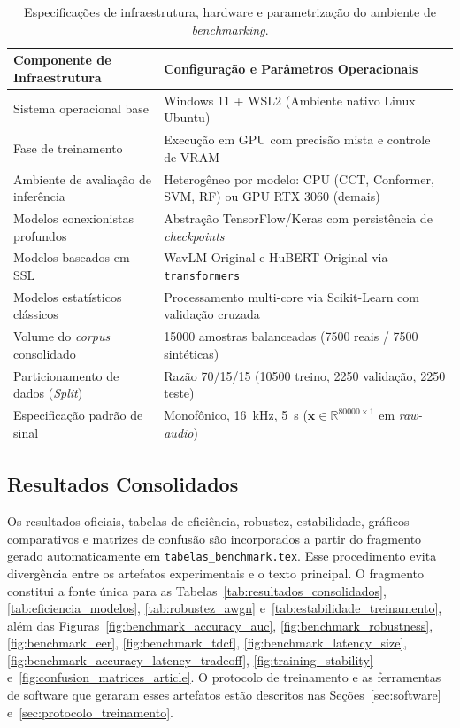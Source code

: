 \documentclass[12pt,a4paper]{article}
\begin{document}
\begin{table}[tbp]
\centering
\caption{Especificações de infraestrutura, hardware e parametrização do ambiente de \textit{benchmarking}.}
\label{tab:hardware_benchmark}
\small\singlespacing
\setlength{\tabcolsep}{4pt}
\begin{tabular}{@{}>{\raggedright\arraybackslash}p{4.2cm}
                >{\raggedright\arraybackslash}p{10.5cm}@{}}
\toprule
\textbf{Componente de Infraestrutura} & \textbf{Configuração e Parâmetros Operacionais} \\
\midrule
Sistema operacional base & Windows 11 + WSL2 (Ambiente nativo Linux Ubuntu) \\
Fase de treinamento & Execução em GPU com precisão mista e controle de VRAM \\
Ambiente de avaliação de inferência & Heterogêneo por modelo: CPU (CCT, Conformer, SVM, RF) ou GPU RTX 3060 (demais) \\
Modelos conexionistas profundos & Abstração TensorFlow/Keras com persistência de \textit{checkpoints} \\
Modelos baseados em SSL & WavLM Original e HuBERT Original via \texttt{transformers} \\
Modelos estatísticos clássicos & Processamento multi-core via Scikit-Learn com validação cruzada \\
Volume do \textit{corpus} consolidado & \num{15000} amostras balanceadas (\num[group-minimum-digits=4]{7500} reais / \num[group-minimum-digits=4]{7500} sintéticas) \\
Particionamento de dados (\textit{Split}) & Razão 70/15/15 (\num{10500} treino, \num[group-minimum-digits=4]{2250} validação, \num[group-minimum-digits=4]{2250} teste) \\
Especificação padrão de sinal & Monofônico, \SI{16}{\kilo\hertz}, \SI{5}{\second} ($\mathbf{x} \in \mathbb{R}^{\num{80000} \times 1}$ em \textit{raw-audio}) \\
\bottomrule
\end{tabular}
\end{table}

\subsection{Resultados Consolidados}
\label{sec:resultados_consolidados}

Os resultados oficiais, tabelas de eficiência, robustez, estabilidade, gráficos
comparativos e matrizes de confusão são incorporados a partir do fragmento
gerado automaticamente em \texttt{tabelas\_benchmark.tex}. Esse procedimento
evita divergência entre os artefatos experimentais e o texto principal. O
fragmento constitui a fonte única para as
Tabelas~\ref{tab:resultados_consolidados}, \ref{tab:eficiencia_modelos},
\ref{tab:robustez_awgn} e~\ref{tab:estabilidade_treinamento}, além das
Figuras~\ref{fig:benchmark_accuracy_auc}, \ref{fig:benchmark_robustness},
\ref{fig:benchmark_eer}, \ref{fig:benchmark_tdcf},
\ref{fig:benchmark_latency_size},
\ref{fig:benchmark_accuracy_latency_tradeoff},
\ref{fig:training_stability} e~\ref{fig:confusion_matrices_article}. O
protocolo de treinamento e as ferramentas de software que geraram esses
artefatos estão descritos nas Seções~\ref{sec:software}
e~\ref{sec:protocolo_treinamento}.
\end{document}
